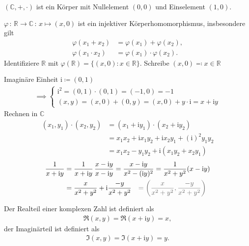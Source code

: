 \begin{notice}
  \begin{enum-arab}
    \item $(\mathbb{C},+,\cdot)$ ist ein Körper mit Nullelement $(0,0)$ und Einselement $(1,0)$.
    
    \item $\varphi \, : \, \mathbb{R} \to \mathbb{C} \, : \, x \mapsto (x,0)$ ist ein injektiver Körperhomomorphismus, insbesondere gilt
    \begin{align*}
      \varphi(x_1 + x_2) &= \varphi(x_1) + \varphi(x_2), \\
      \varphi(x_1 \cdot x_2) &= \varphi(x_1) \cdot \varphi(x_2).
    \end{align*}
    Identifiziere $\mathbb{R}$ mit $\varphi(\mathbb{R})=\{ (x,0) : x \in \mathbb{R} \}$. Schreibe $(x,0) \eqcolon x \in \mathbb{R}$
    
    \item Imaginäre Einheit $\mathrm{i} \coloneq (0,1)$
    \begin{align*}
      \implies
      \begin{cases}
        \mathrm{i}^2 = (0,1) \cdot (0,1) = (-1,0) = -1 \\
        (x,y) = (x,0) + (0,y) = (x,0) + y \cdot \mathrm{i} = x + \mathrm{i} y
      \end{cases}
    \end{align*}
    Rechnen in $\mathbb{C}$
    \begin{align*}
      (x_1,y_1) \cdot (x_2,y_2) &= (x_1 + \mathrm{i} y_1) \cdot (x_2 + \mathrm{i} y_2) \\
      &= x_1 x_2 + \mathrm{i} x_1 y_2 + \mathrm{i} x_2 y_1 + (\mathrm{i})^2 y_1 y_2 \\
      &= x_1 x_2 - y_1 y_2 + \mathrm{i} (x_1 y_2 + x_2 y_1)
    \end{align*}
    \begin{align*}
      \frac{1}{x + \mathrm{i} y} &= \frac{1}{x + \mathrm{i} y} \, \frac{x - \mathrm{i} y}{x - \mathrm{i} y} = \frac{x - \mathrm{i} y}{x^2 - (\mathrm{i} y)^2} = \frac{1}{x^2 + y^2} (x - \mathrm{i} y) \\
      &= \frac{x}{x^2 + y^2} + \mathrm{i} \frac{-y}{x^2 + y^2} \quad {\color{DimGray} = \left( \frac{x}{x^2 + y^2}, \frac{-y}{x^2 + y^2} \right)}
    \end{align*}
  \end{enum-arab}
  
  Der Realteil einer komplexen Zahl ist definiert als
  \begin{align*}
    \Re(x,y) = \Re(x + \mathrm{i} y) = x,
  \end{align*}
  der Imaginärteil ist definiert als
  \begin{align*}
    \Im(x,y) = \Im(x + \mathrm{i} y) = y.
  \end{align*}
  

\end{notice}
